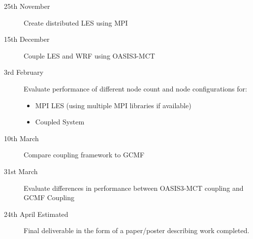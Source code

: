 \documentclass{acm_proc_article-sp}
\renewcommand{\_}{\underscore\hspace{0pt}}
\begin{document}
\begin{description}
	\item[25th November] Create distributed LES using MPI
	\item[15th December] Couple LES and WRF using OASIS3-MCT
	\item[3rd February] Evaluate performance of different node count and node
    configurations for:
    \begin{itemize}
        \item MPI LES (using multiple MPI libraries if available)
        \item Coupled System
    \end{itemize}
	\item[10th March] Compare coupling framework to GCMF
	\item[31st March] Evaluate differences in performance between OASIS3-MCT
    coupling and GCMF Coupling
    \item[24th April Estimated] Final deliverable in the form of a paper/poster
    describing work completed.
\end{description}



\end{document}
